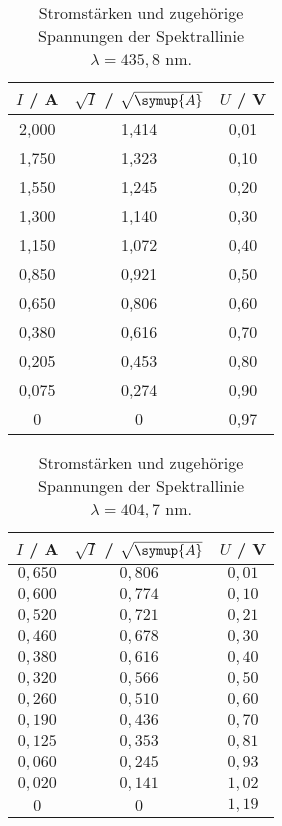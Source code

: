 \begin{table}
\centering
 \caption{Stromstärken und zugehörige Spannungen der Spektrallinie $\lambda = 435,8 $ nm.} 
        \begin{tabular}{c c c}
            \toprule
            { $I$ / A} & {$\sqrt{I}$ / $\sqrt{\symup{A}}$} & {$U$ / V} \\
            \midrule
               2,000 & 1,414 & 0,01 \\
               1,750 & 1,323 & 0,10 \\
               1,550 & 1,245 & 0,20 \\
               1,300 & 1,140 & 0,30 \\
               1,150 & 1,072 & 0,40 \\
               0,850 & 0,921 & 0,50 \\
               0,650 & 0,806 & 0,60 \\
               0,380 & 0,616 & 0,70 \\
               0,205 & 0,453 & 0,80 \\
               0,075 & 0,274 & 0,90 \\
               0     & 0& 0,97 \\
         \bottomrule
        \end{tabular}
       
        \end{table}
\begin{table}
\centering
    \caption{Stromstärken und zugehörige Spannungen der Spektrallinie $\lambda = 404,7 $ nm.} 
    \label{tab:tabelle6}
        \begin{tabular}{c c c}
        
            \toprule
            { $I$ / A} & {$\sqrt{I}$ / $\sqrt{\symup{A}}$} & {$U$ / V} \\
            \midrule
            $0,650$ & $0,806$ & $0,01$ \\
            $0,600$ & $0,774$ & $0,10$ \\
            $0,520$ & $0,721$ & $0,21$ \\
            $0,460$ & $0,678$ & $0,30$ \\
            $0,380$ & $0,616$ & $0,40$ \\
            $0,320$ & $0,566$ & $0,50$ \\
            $0,260$ & $0,510$ & $0,60$ \\
            $0,190$ & $0,436$ & $0,70$ \\
            $0,125$ & $0,353$ & $0,81$ \\
            $0,060$ & $0,245$ & $0,93$ \\
            $0,020$ & $0,141$ & $1,02$ \\
            $0    $ & $0 $    & $1,19$ \\
        \bottomrule
        \end{tabular}
        
        \end{table}
